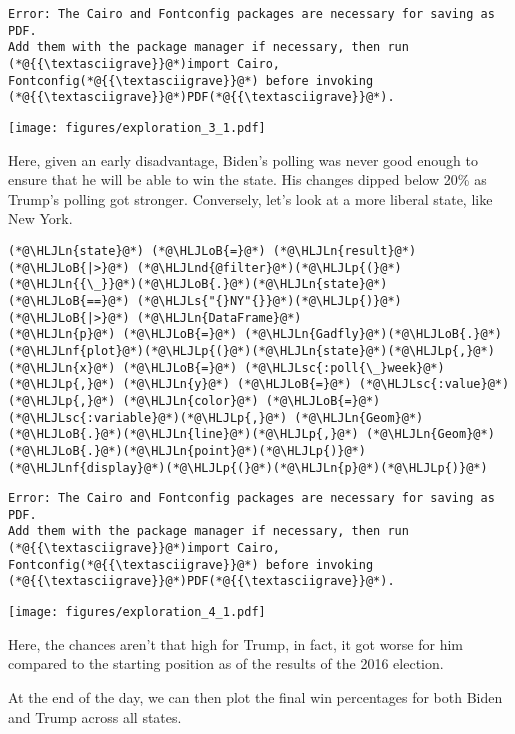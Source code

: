 \documentclass[12pt,a4paper]{article}
\newcommand{\HLJLn}[1]{#1}
\newcommand{\HLJLnd}[1]{\textcolor[RGB]{214,102,97}{#1}}
\newcommand{\HLJLnf}[1]{\textcolor[RGB]{66,102,213}{#1}}
\newcommand{\HLJLs}[1]{\textcolor[RGB]{201,61,57}{#1}}
\newcommand{\HLJLsc}[1]{\textcolor[RGB]{201,61,57}{#1}}
\newcommand{\HLJLoB}[1]{\textcolor[RGB]{102,102,102}{\textbf{#1}}}
\newcommand{\HLJLp}[1]{#1}
\begin{document}
\begin{lstlisting}
Error: The Cairo and Fontconfig packages are necessary for saving as PDF.
Add them with the package manager if necessary, then run (*@{{\textasciigrave}}@*)import Cairo,
Fontconfig(*@{{\textasciigrave}}@*) before invoking (*@{{\textasciigrave}}@*)PDF(*@{{\textasciigrave}}@*).
\end{lstlisting}

\texttt{[image: figures/exploration\_3\_1.pdf]}

Here, given an early disadvantage, Biden's polling was never good enough to ensure that he will be able to win the state. His changes dipped below 20\% as Trump's polling got stronger. Conversely, let's look at a more liberal state, like New York.    


\begin{lstlisting}
(*@\HLJLn{state}@*) (*@\HLJLoB{=}@*) (*@\HLJLn{result}@*) (*@\HLJLoB{|>}@*) (*@\HLJLnd{@filter}@*)(*@\HLJLp{(}@*)(*@\HLJLn{{\_}}@*)(*@\HLJLoB{.}@*)(*@\HLJLn{state}@*) (*@\HLJLoB{==}@*) (*@\HLJLs{"{}NY"{}}@*)(*@\HLJLp{)}@*) (*@\HLJLoB{|>}@*) (*@\HLJLn{DataFrame}@*)
(*@\HLJLn{p}@*) (*@\HLJLoB{=}@*) (*@\HLJLn{Gadfly}@*)(*@\HLJLoB{.}@*)(*@\HLJLnf{plot}@*)(*@\HLJLp{(}@*)(*@\HLJLn{state}@*)(*@\HLJLp{,}@*) (*@\HLJLn{x}@*) (*@\HLJLoB{=}@*) (*@\HLJLsc{:poll{\_}week}@*)(*@\HLJLp{,}@*) (*@\HLJLn{y}@*) (*@\HLJLoB{=}@*) (*@\HLJLsc{:value}@*)(*@\HLJLp{,}@*) (*@\HLJLn{color}@*) (*@\HLJLoB{=}@*) (*@\HLJLsc{:variable}@*)(*@\HLJLp{,}@*) (*@\HLJLn{Geom}@*)(*@\HLJLoB{.}@*)(*@\HLJLn{line}@*)(*@\HLJLp{,}@*) (*@\HLJLn{Geom}@*)(*@\HLJLoB{.}@*)(*@\HLJLn{point}@*)(*@\HLJLp{)}@*) 
(*@\HLJLnf{display}@*)(*@\HLJLp{(}@*)(*@\HLJLn{p}@*)(*@\HLJLp{)}@*)
\end{lstlisting}

\begin{lstlisting}
Error: The Cairo and Fontconfig packages are necessary for saving as PDF.
Add them with the package manager if necessary, then run (*@{{\textasciigrave}}@*)import Cairo,
Fontconfig(*@{{\textasciigrave}}@*) before invoking (*@{{\textasciigrave}}@*)PDF(*@{{\textasciigrave}}@*).
\end{lstlisting}

\texttt{[image: figures/exploration\_4\_1.pdf]}

Here, the chances aren't that high for Trump, in fact, it got worse for him compared to the starting position as of the results of the 2016 election.  

At the end of the day, we can then plot the final win percentages for both Biden and Trump across all states.    
\end{document}
